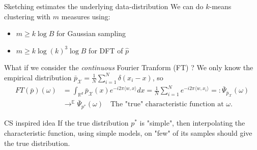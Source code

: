 \begin{frame}{Sketching estimates the underlying data-distribution}
	We can do $k$-means clustering with $m$ measures using:
		\begin{itemize}
			\item $m\geq k\log{B}$ for Gaussian sampling
			\item $m \geq k\log(k)^3\log{B}$ for DFT of $\hat{p}$
		\end{itemize}
	What if we consider the \emph{continuous} Fourier Tranform (FT) ?
	\newline
	We only know the empirical distribution $\bar p_\mathcal{X} = \frac{1}{N}\sum_{i=1}^N \delta(x_i - x)$, so
	\begin{align*}
		FT(\bar p)(\omega) &= \int_{\mathbb{R}^d} \bar p_\mathcal{X}(x) e^{-i2\pi\langle w, x\rangle}dx = \frac{1}{N}\sum_{i=1}^N e^{-i2\pi\langle w,x_i\rangle} =: \bar \Psi_{\bar p_\mathcal{X}}(\omega) \\
				&\longrightarrow^{\mathbb{E}} \bar \Psi_{p^*}(\omega) \quad\text{The "true" characteristic function at $\omega$}.
	\end{align*}
	\begin{block}{CS inspired idea}
		If the true distribution $p^*$ is "simple", then interpolating the characteristic function, using simple models, on "few" of its samples should give the true distribution.
	\end{block}
\end{frame}

